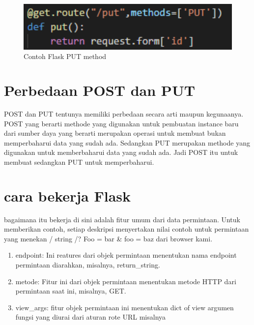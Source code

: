 \begin{figure}[ht]
    \centerline{\includegraphics[width=1\textwidth]{figures/put.png}}
    \caption{Contoh Flask PUT method}
    \label{4PUT}
\end{figure}

\section{Perbedaan POST dan PUT}
POST dan PUT tentunya memiliki perbedaan secara arti maupun kegunaanya. POST yang berarti methode yang digunakan untuk pembuatan
instance baru dari sumber daya yang berarti merupakan operasi untuk membuat bukan memperbaharui data yang sudah ada. 
Sedangkan PUT merupakan methode yang digunakan untuk memberbaharui data yang sudah ada. Jadi POST itu untuk membuat 
sedangkan PUT untuk memperbaharui.

\section{cara bekerja Flask}
bagaimana itu bekerja
 di sini adalah fitur umum dari data permintaan. Untuk memberikan contoh, setiap deskripsi menyertakan nilai contoh untuk permintaan yang menekan / string /? Foo = bar & foo = baz dari browser kami.    
\begin{enumerate}
\item endpoint: Ini reatures dari objek permintaan menentukan nama endpoint permintaan diarahkan, misalnya, return_string.    
\item metode: Fitur ini dari objek permintaan menentukan metode HTTP dari permintaan saat ini, misalnya, GET.   
\item view_args: fitur objek permintaan ini menentukan dict of view argumen fungsi yang diurai dari aturan rote URL misalnya 
\end{enumerate}

